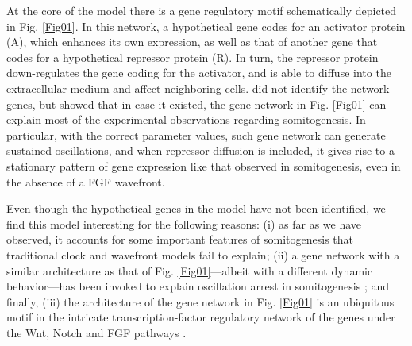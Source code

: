 \documentclass[%
 preprint,
 amsmath,amssymb,
 aps,
]{revtex4-2}
\begin{document}
	At the core of the \citeauthor{Cotterell2015} model there is a gene regulatory
	motif schematically depicted in Fig. \ref{Fig01}. In this network, a
	hypothetical gene codes for an activator protein (A), which enhances its own
	expression, as well as that of another gene that codes for a hypothetical
	repressor protein (R). In turn, the repressor protein down-regulates the gene
	coding for the activator, and is able to diffuse into the extracellular medium
	and affect neighboring cells. \citeauthor{Cotterell2015} did not identify the
	network genes, but showed that in case it existed, the gene network in Fig.
	\ref{Fig01} can explain most of the experimental observations regarding
	somitogenesis. In particular, with the correct parameter values, such gene
	network can generate sustained oscillations, and when repressor diffusion is
	included, it gives rise to a stationary pattern of gene expression like that
	observed in somitogenesis, even in the absence of a FGF wavefront.
	
	Even though the hypothetical genes in the \citeauthor{Cotterell2015} model have
	not been identified, we find this model interesting for the following reasons:
	(i) as far as we have observed, it accounts for some important features of
	somitogenesis that traditional clock and wavefront models fail to explain; (ii)
	a gene network with a similar architecture as that of Fig. \ref{Fig01}---albeit
	with a different dynamic behavior---has been invoked to explain oscillation
	arrest in somitogenesis \citep{Santillan2008, Zavala2012}; and finally, (iii)
	the architecture of the gene network in Fig. \ref{Fig01} is an ubiquitous motif
	in the intricate transcription-factor regulatory network of the genes under the
	Wnt, Notch and FGF pathways \citep{Gibb2010, Zavala2012}.
	
\end{document}

